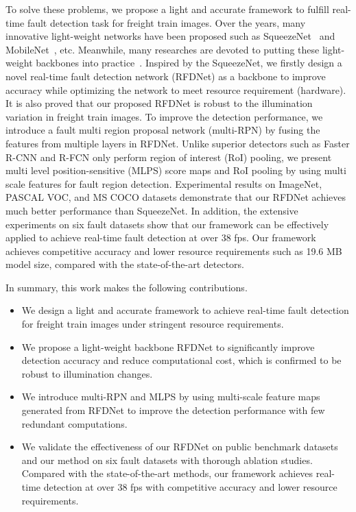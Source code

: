 To solve these problems, we propose a light and accurate framework to fulfill real-time fault detection task for freight train images. Over the years, many innovative light-weight networks have been proposed such as SqueezeNet~\cite{iandola2016squeezenet} and MobileNet~\cite{sandler2018inverted}, etc. Meanwhile, many researches are devoted to putting these light-weight backbones into practice~\cite{muhammad2019efficient, 8673908}. Inspired by the SqueezeNet, we firstly design a novel real-time fault detection network (RFDNet) as a backbone to improve accuracy while optimizing the network to meet resource requirement (hardware). It is also proved that our proposed RFDNet is robust to the illumination variation in freight train images. To improve the detection performance, we introduce a fault multi region proposal network (multi-RPN) by fusing the features from multiple layers in RFDNet. Unlike superior detectors such as Faster R-CNN and R-FCN only perform region of interest (RoI) pooling, we present multi level position-sensitive (MLPS) score maps and RoI pooling by using multi scale features for fault region detection. Experimental results on ImageNet, PASCAL VOC, and MS COCO datasets demonstrate that our RFDNet achieves much better performance than SqueezeNet. In addition, the extensive experiments on six fault datasets show that our framework can be effectively applied to achieve real-time fault detection at over 38 fps. Our framework achieves competitive accuracy and lower resource requirements such as 19.6 MB model size, compared with the state-of-the-art detectors.


In summary, this work makes the following contributions.
\begin{itemize}
  \item We design a light and accurate framework to achieve real-time fault detection for freight train images under stringent resource requirements.
  \item We propose a light-weight backbone RFDNet to significantly improve detection accuracy and reduce computational cost, which is confirmed to be robust to illumination changes.
  \item We introduce multi-RPN and MLPS by using multi-scale feature maps generated from RFDNet to improve the detection performance with few redundant computations.
  \item We validate the effectiveness of our RFDNet on public benchmark datasets and our method on six fault datasets with thorough ablation studies. Compared with the state-of-the-art methods, our framework achieves real-time detection at over 38 fps with competitive accuracy and lower resource requirements.
\end{itemize}

